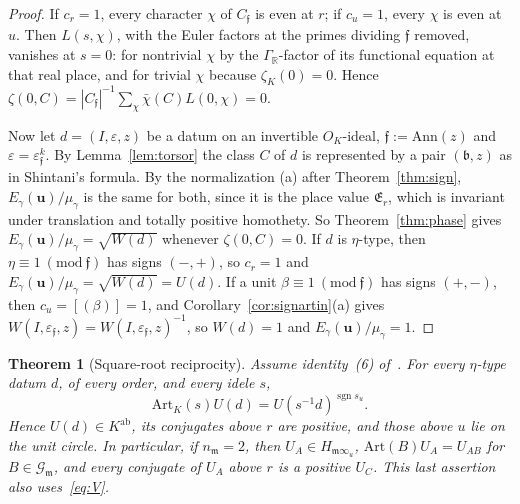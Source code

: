 \documentclass[11pt]{amsart}
\numberwithin{equation}{section}
\theoremstyle{plain}
\newtheorem{theorem}{Theorem}[section]
\theoremstyle{definition}
\theoremstyle{remark}
\begin{document}
\begin{proof}
If \(c_r=1\), every character \(\chi\) of \(C_{\mathfrak f}\) is even at \(r\); if \(c_u=1\), every \(\chi\) is even at \(u\). Then \(L(s,\chi)\), with the Euler factors at the primes dividing \(\mathfrak f\) removed, vanishes at \(s=0\): for nontrivial \(\chi\) by the \(\Gamma_{\mathbb R}\)-factor of its functional equation at that real place, and for trivial \(\chi\) because \(\zeta_K(0)=0\). Hence \(\zeta(0,C)=|C_{\mathfrak f}|^{-1}\sum_\chi\bar\chi(C)L(0,\chi)=0\).

Now let \(d=(I,\varepsilon,z)\) be a datum on an invertible \(O_K\)-ideal, \(\mathfrak f:=\mathrm{Ann}(z)\) and \(\varepsilon=\varepsilon_{\mathfrak f}^k\). By Lemma~\ref{lem:torsor} the class \(C\) of \(d\) is represented by a pair \((\mathfrak b,z)\) as in Shintani's formula. By the normalization (a) after Theorem~\ref{thm:sign}, \(E_\gamma(\mathbf u)/\mu_\gamma\) is the same for both, since it is the place value \(\mathfrak E_r\), which is invariant under translation and totally positive homothety. So Theorem~\ref{thm:phase} gives \(E_\gamma(\mathbf u)/\mu_\gamma=\sqrt{W(d)}\) whenever \(\zeta(0,C)=0\). If \(d\) is \(\eta\)-type, then \(\eta\equiv1\ (\mathrm{mod}\ \mathfrak f)\) has signs \((-,+)\), so \(c_r=1\) and \(E_\gamma(\mathbf u)/\mu_\gamma=\sqrt{W(d)}=U(d)\). If a unit \(\beta\equiv1\ (\mathrm{mod}\ \mathfrak f)\) has signs \((+,-)\), then \(c_u=[(\beta)]=1\), and Corollary~\ref{cor:signartin}(a) gives \(W(I,\varepsilon_{\mathfrak f},z)=W(I,\varepsilon_{\mathfrak f},z)^{-1}\), so \(W(d)=1\) and \(E_\gamma(\mathbf u)/\mu_\gamma=1\).
\end{proof}

\begin{theorem}[Square-root reciprocity]\label{thm:sqrtrec}
Assume identity~(6) of~\cite{RW}. For every \(\eta\)-type datum \(d\), of every order, and every idele \(s\),
\[\mathrm{Art}_K(s)U(d)=U(s^{-1}d)^{\operatorname{sgn}s_u}.\]
Hence \(U(d)\in K^{\mathrm{ab}}\), its conjugates above \(r\) are positive, and those above \(u\) lie on the unit circle. In particular, if \(n_{\mathfrak m}=2\), then \(U_A\in H_{\mathfrak m\infty_u}\), \(\mathrm{Art}(B)U_A=U_{AB}\) for \(B\in\mathcal G_{\mathfrak m}\), and every conjugate of \(U_A\) above \(r\) is a positive \(U_C\). This last assertion also uses~\eqref{eq:V}.
\end{theorem}
\end{document}
